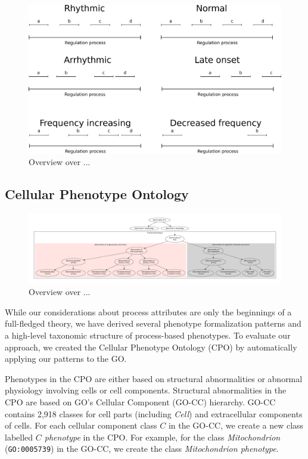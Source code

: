 \documentclass{bioinfo}
\begin{document}
\begin{figure}
  \centering
  \includegraphics[width=.5\textwidth]{processpatterns.pdf}
  \caption{Overview over ...\label{fig:patterns}}
\end{figure}


\subsection{Cellular Phenotype Ontology}
\begin{figure}[h]
  \centering
  \includegraphics[width=\textwidth,
  height=.33\textheight]{overview.pdf}
  \caption{Overview over ...\label{fig:overview}}
\end{figure}

While our considerations about process attributes are only the
beginnings of a full-fledged theory, we have derived several phenotype
formalization patterns and a high-level taxonomic structure of
process-based phenotypes. To evaluate our approach, we created the
Cellular Phenotype Ontology (CPO) by automatically applying our
patterns to the GO.

Phenotypes in the CPO are either based on structural abnormalities or
abnormal physiology involving cells or cell components. Structural
abnormalities in the CPO are based on GO's Cellular Component (GO-CC)
hierarchy. GO-CC contains 2,918 classes for cell parts (including {\em
  Cell}) and extracellular components of cells. For each cellular
component class $C$ in the GO-CC, we create a new class labelled {\em
  $C$ phenotype} in the CPO. For example, for the class {\em
  Mitochondrion} ({\tt GO:0005739}) in the GO-CC, we create the class
{\em Mitochondrion phenotype}.
\end{document}
